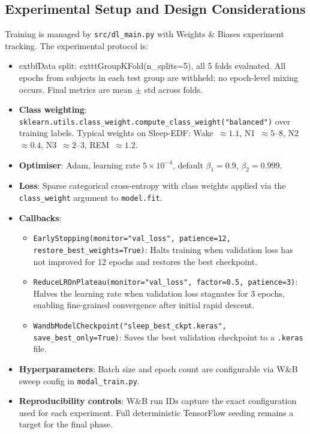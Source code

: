 \documentclass[10pt]{article}
\begin{document}
\subsection{Experimental Setup and Design Considerations}
\label{sec:expSetup}

Training is managed by \texttt{src/dl\_main.py} with Weights \& Biases experiment tracking. The experimental protocol is:

\begin{itemize}
  \item 	extbf{Data split}: 	exttt{GroupKFold(n\_splits=5)}, all 5 folds evaluated. All epochs from subjects in each test group are withheld; no epoch-level mixing occurs. Final metrics are mean $\pm$ std across folds.
  \item \textbf{Class weighting}: \texttt{sklearn.utils.class\_weight.compute\_class\_weight("balanced")} over training labels. Typical weights on Sleep-EDF: Wake~$\approx 1.1$, N1~$\approx 5$--$8$, N2~$\approx 0.4$, N3~$\approx 2$--$3$, REM~$\approx 1.2$.
  \item \textbf{Optimiser}: Adam, learning rate $5 \times 10^{-4}$, default $\beta_1=0.9$, $\beta_2=0.999$.
  \item \textbf{Loss}: Sparse categorical cross-entropy with class weights applied via the \texttt{class\_weight} argument to \texttt{model.fit}.
  \item \textbf{Callbacks}:
    \begin{itemize}
      \item \texttt{EarlyStopping(monitor="val\_loss", patience=12, restore\_best\_weights=True)}: Halts training when validation loss has not improved for 12 epochs and restores the best checkpoint.
      \item \texttt{ReduceLROnPlateau(monitor="val\_loss", factor=0.5, patience=3)}: Halves the learning rate when validation loss stagnates for 3 epochs, enabling fine-grained convergence after initial rapid descent.
      \item \texttt{WandbModelCheckpoint("sleep\_best\_ckpt.keras", save\_best\_only=True)}: Saves the best validation checkpoint to a \texttt{.keras} file.
    \end{itemize}
  \item \textbf{Hyperparameters}: Batch size and epoch count are configurable via W\&B sweep config in \texttt{modal\_train.py}.
  \item \textbf{Reproducibility controls}: W\&B run IDs capture the exact configuration used for each experiment. Full deterministic TensorFlow seeding remains a target for the final phase.
\end{itemize}
\end{document}
